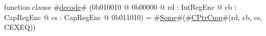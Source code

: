function clause #\hyperref[sailMIPSzdecode]{decode}# (0b010010 @ 0b00000 @ rd : IntRegEnc @ cb : CapRegEnc @ cs : CapRegEnc @ 0b011010) = #\hyperref[sailMIPSzSome]{Some}#(#\hyperref[sailMIPSzCPtrCmp]{CPtrCmp}#(rd, cb, cs, CEXEQ))

